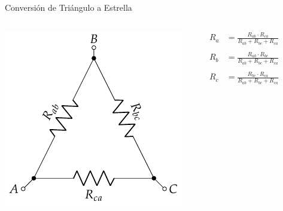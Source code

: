 \documentclass[aspectratio=169, usenames,svgnames,dvipsnames]{beamer}
\begin{document}
\begin{frame}[label={sec:org2ba67cd}]{Conversión de Triángulo a Estrella}
\begin{columns}
\begin{column}{0.3\columnwidth}
\begin{center}
\includegraphics[width=.9\linewidth]{../figs/Conexion_Triangulo.pdf}
\end{center}
\end{column}
\begin{column}{0.4\columnwidth}
\begin{align*}
  R_a &= \frac{R_{ab} \cdot R_{ca}}{R_{ab} + R_{bc} + R_{ca}}\\
  \\
  R_b &= \frac{R_{ab} \cdot R_{bc}}{R_{ab} + R_{bc} + R_{ca}}\\
  \\
  R_c &= \frac{R_{bc} \cdot R_{ca}}{R_{ab} + R_{bc} + R_{ca}}
\end{align*}
\end{column}
\begin{column}{0.3\columnwidth}
\begin{center}

\end{center}
\end{column}
\end{columns}
\end{frame}
\end{document}
